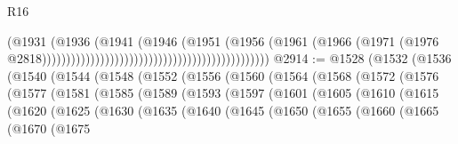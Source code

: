 \begin{lexlean}{R16}
\begin{coremodule}
                                                                              (@1931
                                                                                (@1936
                                                                                  (@1941
                                                                                    (@1946
                                                                                      (@1951
                                                                                        (@1956
                                                                                          (@1961
                                                                                            (@1966
                                                                                              (@1971
                                                                                                (@1976
                                                                                                  @2818)))))))))))))))))))))))))))))))))))))))))))))))
@2914 := @1528
    (@1532
      (@1536
        (@1540
          (@1544
            (@1548
              (@1552
                (@1556
                  (@1560
                    (@1564
                      (@1568
                        (@1572
                          (@1576
                            (@1577
                              (@1581
                                (@1585
                                  (@1589
                                    (@1593
                                      (@1597
                                        (@1601
                                          (@1605
                                            (@1610
                                              (@1615
                                                (@1620
                                                  (@1625
                                                    (@1630
                                                      (@1635
                                                        (@1640
                                                          (@1645
                                                            (@1650
                                                              (@1655
                                                                (@1660
                                                                  (@1665
                                                                    (@1670
                                                                      (@1675

\end{coremodule}
\end{lexlean}
